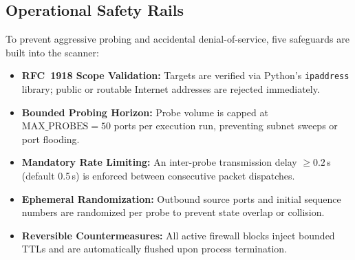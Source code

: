 \subsection{Operational Safety Rails}\label{sec:safety}
To prevent aggressive probing and accidental denial-of-service, five safeguards are built into the scanner:
\begin{itemize}
    \item \textbf{RFC~1918 Scope Validation:} Targets are verified via Python's \texttt{ipaddress}
    library; public or routable Internet addresses are rejected immediately.
    \item \textbf{Bounded Probing Horizon:} Probe volume is capped at $\text{MAX\_PROBES} = 50$
    ports per execution run, preventing subnet sweeps or port flooding.
    \item \textbf{Mandatory Rate Limiting:} An inter-probe transmission delay $\ge 0.2$\,s (default
    0.5\,s) is enforced between consecutive packet dispatches.
    \item \textbf{Ephemeral Randomization:} Outbound source ports and initial sequence numbers are
    randomized per probe to prevent state overlap or collision.
    \item \textbf{Reversible Countermeasures:} All active firewall blocks inject bounded TTLs and
    are automatically flushed upon process termination.
\end{itemize}
